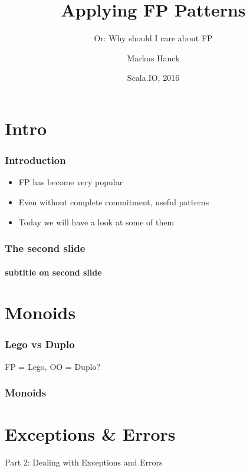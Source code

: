 \documentclass{beamer}
\title{Applying FP Patterns}
\subtitle{Or: Why should I care about FP}
\author{Markus Hauck}
\date{Scala.IO, 2016}
\begin{document}
\frame{\titlepage}

\section{Intro}
\label{sec:intro}

\begin{frame}
  \frametitle{Introduction}
  \begin{itemize}
  \item FP has become very popular
  \item Even without complete commitment, useful patterns
  \item Today we will have a look at some of them
  \end{itemize}
\end{frame}
\begin{frame}
  \frametitle{The second slide}
  \framesubtitle{subtitle on second slide}
\end{frame}

\section{Monoids}
\label{sec:monoids}

\begin{frame}
  \frametitle{Lego vs Duplo}
  FP = Lego, OO = Duplo?
\end{frame}

\begin{frame}
  \frametitle{Monoids}

\end{frame}

\section{Exceptions \& Errors}
\label{sec:exceptions-and-errors}

\begin{frame}[c]
  \begin{center}
    Part 2: Dealing with Exceptions and Errors
  \end{center}
\end{frame}
\end{document}
